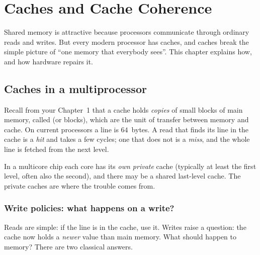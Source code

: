 \chapter{Caches and Cache Coherence}
\label{ch:coherence}

\newcommand{\Cread}{\textit{C\_read}}
\newcommand{\Cwrite}{\textit{C\_write}}

Shared memory is attractive because processors communicate through ordinary reads and writes. But
every modern processor has caches, and caches break the simple picture of ``one memory that everybody sees''.
This chapter explains how, and how hardware repairs it.

\section{Caches in a multiprocessor}

Recall from your Chapter~1 that a cache holds \emph{copies} of small blocks of main memory, called
 (or blocks), which are the unit of transfer between memory and cache. On current
processors a line is $64$~bytes. A read that finds its line in the cache is a \emph{hit} and takes a few cycles; one that does not is a
\emph{miss}, and the whole line is fetched from the next level.

In a multicore chip each core has its \emph{own private} cache (typically at least the first level, often also the second), and there may be a shared last-level cache. The private caches are where the trouble comes from.

\begin{center}
\end{center}

\subsection{Write policies: what happens on a write?}
\label{sec:writepolicy}

Reads are simple: if the line is in the cache, use it. Writes raise a question: the cache now holds a
\emph{newer} value than main memory. What should happen to memory? There are two classical answers.

